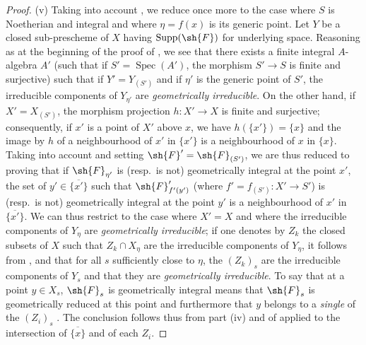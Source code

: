 \begin{proof}
(v) Taking into account , we reduce once more to the case where $S$ is Noetherian and integral and where $\eta=f(x)$ is its generic point.
Let $Y$ be a closed sub-prescheme of $X$ having $\operatorname{Supp}(\sh{F})$ for underlying space.
Reasoning as at the beginning of the proof of , we see that there exists a finite integral $A$-algebra $A'$ (such that if $S'=\operatorname{Spec}(A')$, the morphism $S'\to S$ is finite and surjective) such that if $Y'=Y_{(S')}$ and if $\eta'$ is the generic point of $S'$, the irreducible components of $Y_{\eta'}$ are \emph{geometrically irreducible}.
On the other hand, if $X'=X_{(S')}$, the morphism projection $h:X'\to X$ is finite and surjective; consequently, if $x'$ is a point of $X'$ above $x$, we have $h(\{x'\})=\{x\}$ and the image by $h$ of a neighbourhood of $x'$ in $\{x'\}$ is a neighbourhood of $x$ in $\{x\}$.
Taking into account  and setting $\sh{F}'=\sh{F}_{(S')}$, we are thus reduced to proving that if $\sh{F}_{\eta'}$ is (resp.~is not) geometrically integral at the point $x'$, the set of $y'\in\overline{\{x'\}}$ such that $\sh{F}'_{f'(y')}$ (where $f'=f_{(S')}:X'\to S'$) is (resp.~is not) geometrically integral at the point $y'$ is a neighbourhood of $x'$ in $\overline{\{x'\}}$.
We can thus restrict to the case where $X'=X$ and where the irreducible components of $Y_\eta$ are \emph{geometrically irreducible}; if one denotes by $Z_k$ the closed subsets of $X$ such that $Z_k\cap X_\eta$ are the irreducible components of $Y_\eta$, it follows from ,  and  that for all $s$ sufficiently close to $\eta$, the $(Z_k)_s$ are the irreducible components of $Y_s$ and that they are \emph{geometrically irreducible}.
To say that at a point $y\in X_s$, $\sh{F}_s$ is geometrically integral means that $\sh{F}_s$ is geometrically reduced at this point and furthermore that $y$ belongs to a \emph{single} of the $(Z_i)_s$ .
The conclusion follows thus from part (iv) and of  applied to the intersection of $\overline{\{x\}}$ and of each $Z_i$.


\end{proof}
